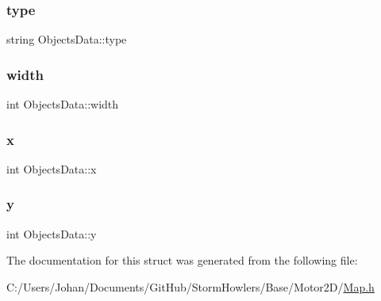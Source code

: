 \mbox{\label{struct_objects_data_ad068c58dced02a94ae114f4724dc64ef}} 
\subsubsection{\texorpdfstring{type}{type}}
{\footnotesize\ttfamily string Objects\+Data\+::type}

\mbox{\label{struct_objects_data_a8502fe4a9822cd85652db1614e8e067f}} 
\subsubsection{\texorpdfstring{width}{width}}
{\footnotesize\ttfamily int Objects\+Data\+::width}

\mbox{\label{struct_objects_data_a13664f0c3a97bc492575d4d62d33959a}} 
\subsubsection{\texorpdfstring{x}{x}}
{\footnotesize\ttfamily int Objects\+Data\+::x}

\mbox{\label{struct_objects_data_ad7eab866cc5b483078ad684e9e4c2618}} 
\subsubsection{\texorpdfstring{y}{y}}
{\footnotesize\ttfamily int Objects\+Data\+::y}



The documentation for this struct was generated from the following file\+:\begin{DoxyCompactItemize}
\item 
C\+:/\+Users/\+Johan/\+Documents/\+Git\+Hub/\+Storm\+Howlers/\+Base/\+Motor2\+D/\mbox{\hyperlink{_map_8h}{Map.\+h}}\end{DoxyCompactItemize}
